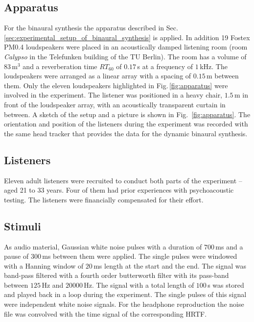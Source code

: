 \subsection{Apparatus}
%
For the binaural synthesis the apparatus described in
Sec.\,\ref{sec:experimental_setup_of_binaural_synthesis} is applied.
In addition 19 Fostex {\small PM0.4}
loudspeakers were placed in an acoustically damped
listening room (room \emph{Calypso} in the Telefunken building of the {\small TU} Berlin).
The room has a volume of $83$\,m$^3$ and a reverberation time $RT_{60}$ of $0.17$\,s
at a frequency of $1$\,kHz.
The loudspeakers were arranged as a linear array with a spacing of $0.15$\,m
between them. Only the eleven loudspeakers highlighted in
Fig.\,\ref{fig:apparatus} were involved in the experiment.
The listener was positioned in a heavy chair,
$1.5$\,m in front of the
loudspeaker array, with an acoustically transparent curtain in between.
A sketch of the setup and a picture is shown in Fig.~\ref{fig:apparatus}.
The orientation and position of the listeners during the experiment was recorded
with the same head tracker that provides the data for the dynamic binaural synthesis.

\subsection{Listeners}
%
Eleven adult listeners were recruited to conduct both parts of the experiment
-- aged 21 to 33 years.
Four of them had prior experiences with psychoacoustic testing.
The listeners were financially compensated for their effort.

\subsection{Stimuli}
%
As audio material, Gaussian white noise pulses with a duration of $700$\,ms and
a
pause of $300$\,ms between them were applied. The single pulses were windowed
with a Hanning window of $20$\,ms length at the start and the end.
The signal was band-pass filtered with a fourth order butterworth filter with
its pass-band between $125$\,Hz and $20000$\,Hz.
The signal with a total length of $100$\,s was stored and played back in a loop
during the experiment. The single pulses of this signal were independent white noise
signals.
For the headphone reproduction the noise file was convolved with the time signal
of the corresponding \ac{HRTF}.

